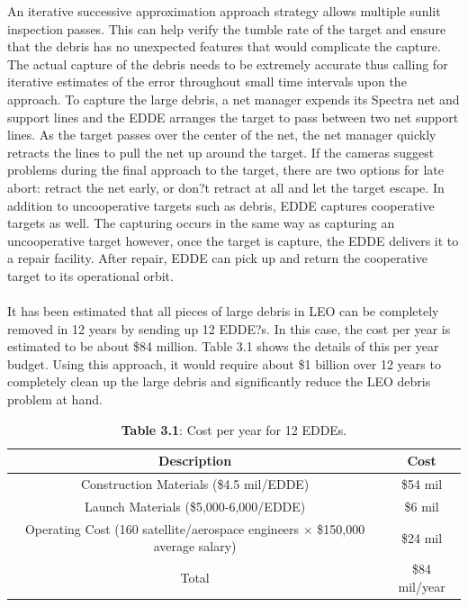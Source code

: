 \documentclass{article}
\theoremstyle{plain}			%
\theoremstyle{definition}		%
\theoremstyle{remark}
\numberwithin{equation}{section}
\numberwithin{figure}{section}
\numberwithin{table}{section}
\begin{document}
An iterative successive approximation approach strategy allows multiple sunlit inspection passes. This can help verify the tumble rate of the target and ensure that the debris has no unexpected features that would complicate the capture. The actual capture of the debris needs to be extremely accurate thus calling for iterative estimates of the error throughout small time intervals upon the approach.  To capture the large debris, a net manager expends its Spectra net and support lines and the EDDE arranges the target to pass between two net support lines. As the target passes over the center of the net, the net manager quickly retracts the lines to pull the net up around the target. If the cameras suggest problems during the final approach to the target, there are two options for late abort: retract the net early, or don?t retract at all and let the target escape. In addition to uncooperative targets such as debris, EDDE captures cooperative targets as well.  The capturing occurs in the same way as capturing an uncooperative target however, once the target is capture, the EDDE delivers it to a repair facility. After repair, EDDE can pick up and return the cooperative target to its operational orbit.\\ 
\\
It has been estimated that all pieces of large debris in LEO can be completely removed in 12 years by sending up 12 EDDE?s. In this case, the cost per year is estimated to be about \$84 million. Table 3.1 shows the details of this per year budget. Using this approach, it would require about \$1 billion over 12 years to completely clean up the large debris and significantly reduce the LEO debris problem at hand.




\begin{table}[H]
\centering
\begin{tabular}{| c | c  |}
\hline
Description  & Cost\\
\hline
Construction Materials (\$4.5 mil/EDDE) & \$54 mil\\
\hline
Launch Materials (\$5,000-6,000/EDDE) & \$6 mil\\
\hline
Operating Cost (160 satellite/aerospace engineers $\times$ \$150,000 average salary) & \$24 mil\\
\hline
Total  & \$84 mil/year \\
\hline
\end{tabular}
\caption*{\small{\textbf{Table 3.1}: Cost per year for 12 EDDEs.}}
\label{tab_fits}
\end{table}
\end{document}
